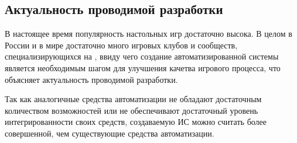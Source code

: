 \subsection{Актуальность проводимой разработки}

В настоящее время популярность настольных игр достаточно высока. В целом в России и в мире достаточно много игровых клубов и сообществ, специализирующихся на \dnd, ввиду чего создание автоматизированной системы является необходимым шагом для улучшения качетва игрового процесса, что объясняет актуальность проводимой разработки.

Так как аналогичные средства автоматизации не обладают достаточным количеством возможностей или не обеспечивают достаточный уровень интегрированности своих средств, создаваемую ИС можно считать более совершенной, чем существующие средства автоматизации.
